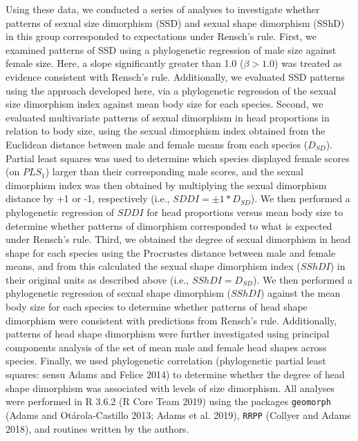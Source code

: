 \documentclass[]{article}
\begin{document}
Using these data, we conducted a series of analyses to investigate
whether patterns of sexual size dimorphism (SSD) and sexual shape
dimorphism (SShD) in this group corresponded to expectations under
Rensch's rule. First, we examined patterns of SSD using a phylogenetic
regression of male size against female size. Here, a slope significantly
greater than 1.0 (\(\beta>1.0\)) was treated as evidence consistent with
Rensch's rule. Additionally, we evaluated SSD patterns using the
approach developed here, via a phylogenetic regression of the sexual
size dimorphism index against mean body size for each species. Second,
we evaluated multivariate patterns of sexual dimorphism in head
proportions in relation to body size, using the sexual dimorphism index
obtained from the Euclidean distance between male and female means from
each species (\(D_{SD}\)). Partial least squares was used to determine
which species displayed female scores (on \(PLS_1\)) larger than their
corresponding male scores, and the sexual dimorphism index was then
obtained by multiplying the sexual dimorphism distance by +1 or -1,
respectively (i.e., \(SDDI=\pm1*D_{SD}\)). We then performed a
phylogenetic regression of \(SDDI\) for head proportions versus mean
body size to determine whether patterns of dimorphism corresponded to
what is expected under Rensch's rule. Third, we obtained the degree of
sexual dimorphism in head shape for each species using the Procrustes
distance between male and female means, and from this calculated the
sexual shape dimorphism index (\(SShDI\)) in their original units as
described above (i.e., \(SShDI=D_{SD}\)). We then performed a
phylogenetic regression of sexual shape dimorphism (\(SShDI\)) against
the mean body size for each species to determine whether patterns of
head shape dimorphism were consistent with predictions from Rensch's
rule. Additionally, patterns of head shape dimorphism were further
investigated using principal components analysis of the set of mean male
and female head shapes across species. Finally, we used phylogenetic
correlation (phylogenetic partial least squares: sensu Adams and Felice
2014) to determine whether the degree of head shape dimorphism was
associated with levels of size dimorphism. All analyses were performed
in R 3.6.2 (R Core Team 2019) using the packages \texttt{geomorph}
(Adams and Otárola-Castillo 2013; Adams et al. 2019), \texttt{RRPP}
(Collyer and Adams 2018), and routines written by the authors.
\hfill\break
\end{document}
